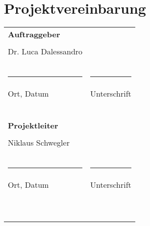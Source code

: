 \section{Projektvereinbarung}
\begin{tabular}{l l}
\textbf{Auftraggeber} &\\
&\\
Dr. Luca Dalessandro \\
&\\
&\\
&\\
\rule{6cm}{0.5pt} & \rule{6cm}{0.5pt}\\
Ort, Datum & Unterschrift\\
&\\
&\\
&\\
&\\
&\\
&\\
\textbf{Projektleiter} &\\
&\\
Niklaus Schwegler&\\
&\\
&\\
&\\
\rule{6cm}{0.5pt} & \rule{6cm}{0.5pt}\\
Ort, Datum & Unterschrift\\
&\\
&\\
&\\
&\\
&\\
&\\
&\\
&\\
&\\
&\\

\end{tabular}

